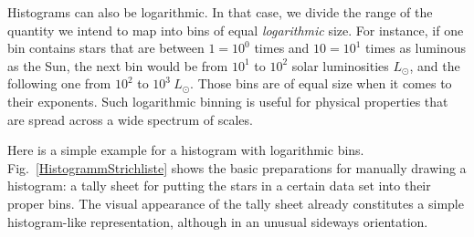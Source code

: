 \documentclass[twocolumn,apj]{openjournal}
\begin{document}
Histograms can also be logarithmic. In that case, we divide the range of the quantity we intend to map into bins of equal {\em logarithmic} size. For instance, if one bin contains stars that are between $1=10^0$ times and $10=10^1$ times as luminous as the Sun, the next bin would be from $10^1$ to $10^2$ solar luminosities $L_{\odot}$, and the following one from $10^2$ to $10^3\:L_{\odot}$. Those bins are of equal size when it comes to their exponents. Such logarithmic binning is useful for physical properties that are spread across a wide spectrum of scales. 

Here is a simple example for a histogram with logarithmic bins. Fig.~\ref{HistogrammStrichliste} shows the basic preparations for manually drawing a histogram: a tally sheet for putting the stars in a certain data set into their proper bins. The visual appearance of the tally sheet already constitutes a simple histogram-like representation, although in an unusual sideways orientation.
\end{document}
